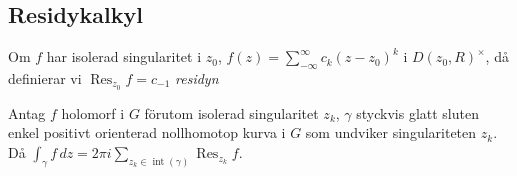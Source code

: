 \subsection{Residykalkyl}
\begin{definition}
Om $f$ har isolerad singularitet i $z_0$, $f(z) = \sum_{-\infty}^\infty c_k(z - z_0)^k$ i $D(z_0, R)^\times$, då definierar vi $\operatorname{Res}_{z_0} f = c_{-1}$ \emph{residyn}
\end{definition}

\begin{theorem}
Antag $f$ holomorf i $G$ förutom isolerad singularitet $z_k$, $\gamma$ styckvis glatt sluten enkel positivt orienterad nollhomotop kurva i $G$ som undviker singulariteten $z_k$.
Då $\displaystyle\int_\gamma f\,dz = 2\pi i \sum_{z_k \in \operatorname{int}(\gamma)} \operatorname{Res}_{z_k} f$.
\end{theorem}
